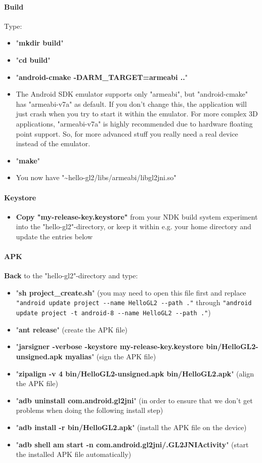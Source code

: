 \paragraph{Build}
Type:
\begin{itemize}
\item{"\textbf{mkdir build}"}
\item{"\textbf{cd build}"}
\item{"\textbf{android-cmake -DARM\_TARGET=armeabi ..}"}
\item{\textrightarrow{} The Android \ac{SDK} emulator supports only "armeabi", but "android-cmake" has "armeabi-v7a" as default. If you don't change this, the application will just crash when you try to start it within the emulator. For more complex 3D applications, "armeabi-v7a" is highly recommended due to hardware floating point support. So, for more advanced stuff you really need a real device instead of the emulator.}
\item{"\textbf{make}"}
\item{\textrightarrow{} You now have "\textasciitilde hello-gl2/libs/armeabi/libgl2jni.so"}
\end{itemize}


\paragraph{Keystore}
\begin{itemize}
\item{\textbf{Copy "my-release-key.keystore"} from your \ac{NDK} build system experiment into the "hello-gl2"-directory, or keep it within e.g. your home directory and update the entries below}
\end{itemize}


\paragraph{\ac{APK}}
\textbf{Back} to the "hello-gl2"-directory and type:
\begin{itemize}
\item{"\textbf{sh project\_create.sh}" (you may need to open this file first and replace \verb+"android update project --name HelloGL2 --path ."+ through \verb+"android update project -t android-8 --name HelloGL2 --path ."+)}
\item{"\textbf{ant release}" (create the \ac{APK} file)}
\item{"\textbf{jarsigner -verbose -keystore my-release-key.keystore bin/HelloGL2-unsigned.apk myalias}" (sign the \ac{APK} file)}
\item{"\textbf{zipalign -v 4 bin/HelloGL2-unsigned.apk bin/HelloGL2.apk}" (align the \ac{APK} file)}
\item{"\textbf{adb uninstall com.android.gl2jni}" (in order to ensure that we don't get problems when doing the following install step)}
\item{"\textbf{adb install -r bin/HelloGL2.apk}" (install the \ac{APK} file on the device)}
\item{"\textbf{adb shell am start -n com.android.gl2jni/.GL2JNIActivity}" (start the installed \ac{APK} file automatically)}
\end{itemize}



